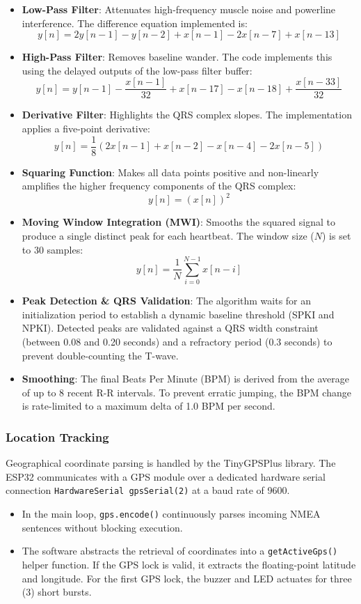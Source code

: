 \documentclass{article}
\begin{document}
\begin{itemize}
\item \textbf{Low-Pass Filter}: Attenuates high-frequency muscle noise and powerline interference. The difference equation implemented is:
$$y[n] = 2y[n-1] - y[n-2] + x[n-1] - 2x[n-7] + x[n-13]$$

\item \textbf{High-Pass Filter}: Removes baseline wander. The code implements this using the delayed outputs of the low-pass filter buffer:
$$y[n] = y[n-1] - \frac{x[n-1]}{32} + x[n-17] - x[n-18] + \frac{x[n-33]}{32}$$

\item \textbf{Derivative Filter}: Highlights the QRS complex slopes. The implementation applies a five-point derivative:
$$y[n] = \frac{1}{8} (2x[n-1] + x[n-2] - x[n-4] - 2x[n-5])$$

\item \textbf{Squaring Function}: Makes all data points positive and non-linearly amplifies the higher frequency components of the QRS complex:
$$y[n] = (x[n])^2$$

\item \textbf{Moving Window Integration (MWI)}: Smooths the squared signal to produce a single distinct peak for each heartbeat. The window size ($N$) is set to 30 samples:
$$y[n] = \frac{1}{N} \sum_{i=0}^{N-1} x[n-i]$$

\item \textbf{Peak Detection \& QRS Validation}: The algorithm waits for an initialization period to establish a dynamic baseline threshold (SPKI and NPKI). Detected peaks are validated against a QRS width constraint (between 0.08 and 0.20 seconds) and a refractory period (0.3 seconds) to prevent double-counting the T-wave.

\item \textbf{Smoothing}: The final Beats Per Minute (BPM) is derived from the average of up to 8 recent R-R intervals. To prevent erratic jumping, the BPM change is rate-limited to a maximum delta of 1.0 BPM per second.
\end{itemize}

\subsubsection{Location Tracking}
Geographical coordinate parsing is handled by the TinyGPSPlus library. The ESP32 communicates with a GPS module over a dedicated hardware serial connection \verb|HardwareSerial gpsSerial(2)| at a baud rate of 9600.
\begin{itemize}
    \item In the main loop, \verb|gps.encode()| continuously parses incoming NMEA sentences without blocking execution. 
    \item The software abstracts the retrieval of coordinates into a \verb|getActiveGps()| helper function. If the GPS lock is valid, it extracts the floating-point latitude and longitude. For the first GPS lock, the buzzer and LED actuates for three (3) short bursts.

\end{itemize}
\end{document}
